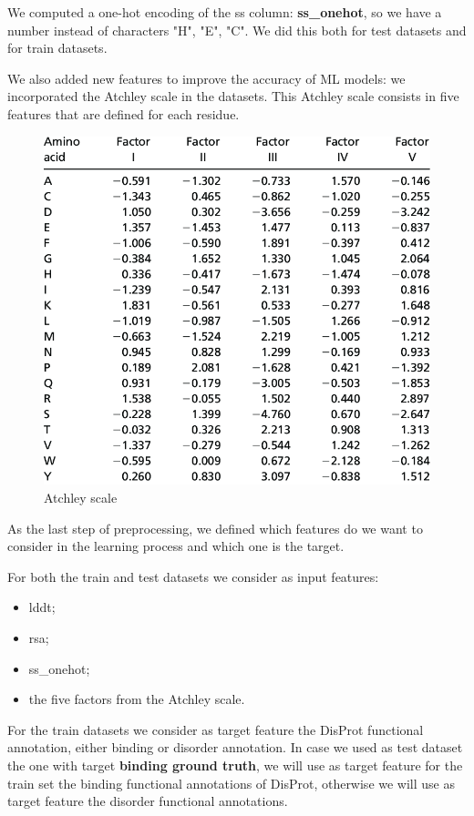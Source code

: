 We computed a one-hot encoding of the ss column: \textbf{ss\_onehot}, so we have a number instead of characters "H", "E", "C". We did this both for test datasets and for train datasets. 

We also added new features to improve the accuracy of ML models: we incorporated the Atchley scale in the datasets. This Atchley scale consists in five features that are defined for each residue.

\begin{figure}
    \centering
    \includegraphics[scale=0.4]{res/ML/atchley.png}
    \caption{Atchley scale}
\end{figure}

As the last step of preprocessing, we defined which features do we want to consider in the learning process and which one is the target. 

For both the train and test datasets we consider as input features:
\begin{itemize}
    \item lddt;
    \item rsa;
    \item ss\_onehot;
    \item the five factors from the Atchley scale.
\end{itemize}
For the train datasets we consider as target feature the DisProt functional annotation, either binding or disorder annotation. In case we used as test dataset the one with target \textbf{binding ground truth}, we will use as target feature for the train set the binding functional annotations of DisProt, otherwise we will use as target feature the disorder functional annotations.

